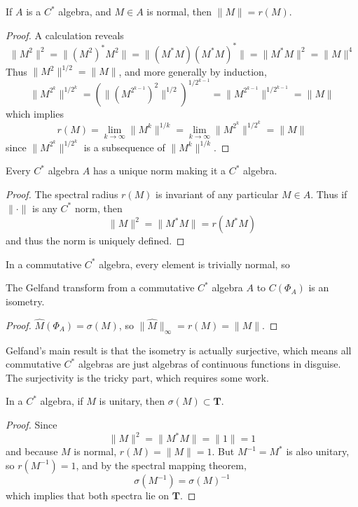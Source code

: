 \begin{prop}
    If $A$ is a $C^*$ algebra, and $M \in A$ is normal, then $\| M \| = r(M)$.
\end{prop}
\begin{proof}
    A calculation reveals
    \[ \| M^2 \|^2 = \| (M^2)^* M^2 \| = \| (M^* M) (M^* M)^* \| = \| M^* M \|^2 = \| M \|^4 \]
    Thus $\| M^2 \|^{1/2} = \| M \|$, and more generally by induction,
    \[ \| M^{2^k} \|^{1/2^k} = \left( \| (M^{2^{k-1}})^2 \|^{1/2} \right)^{1/2^{k-1}} = \| M^{2^{k-1}} \|^{1/2^{k-1}} = \| M \| \]
    which implies
    \[ r(M) = \lim_{k \to \infty} \| M^k \|^{1/k} = \lim_{k \to \infty} \| M^{2^k} \|^{1/2^k} = \| M \| \]
    since $\| M^{2^k} \|^{1/2^k}$ is a subsequence of $\| M^k \|^{1/k}$.
\end{proof}

\begin{corollary}
    Every $C^*$ algebra $A$ has a unique norm making it a $C^*$ algebra.
\end{corollary}
\begin{proof}
    The spectral radius $r(M)$ is invariant of any particular $M \in A$. Thus if $\| \cdot \|$ is any $C^*$ norm, then
    \[ \| M \|^2 = \| M^*M \| = r(M^*M) \]
    and thus the norm is uniquely defined.
\end{proof}

In a commutative $C^*$ algebra, every element is trivially normal, so

\begin{corollary}
    The Gelfand transform from a commutative $C^*$ algebra $A$ to $C(\Phi_A)$ is an isometry.
\end{corollary}
\begin{proof}
    $\widehat{M}(\Phi_A) = \sigma(M)$, so $\|\widehat{M}\|_\infty = r(M) = \| M \|$.
\end{proof}

Gelfand's main result is that the isometry is actually surjective, which means all commutative $C^*$ algebras are just algebras of continuous functions in disguise. The surjectivity is the tricky part, which requires some work.

\begin{prop}
    In a $C^*$ algebra, if $M$ is unitary, then $\sigma(M) \subset \mathbf{T}$.
\end{prop}
\begin{proof}
    Since
    \[ \| M \|^2 = \| M^* M \| = \| 1 \| = 1 \]
    and because $M$ is normal, $r(M) = \| M \| = 1$. But $M^{-1} = M^*$ is also unitary, so $r(M^{-1}) = 1$, and by the spectral mapping theorem,
    \[ \sigma(M^{-1}) = \sigma(M)^{-1} \]
    which implies that both spectra lie on $\mathbf{T}$.
\end{proof}

